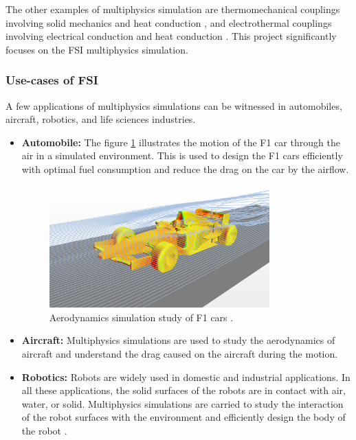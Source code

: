 The other examples of multiphysics simulation are thermomechanical couplings involving solid mechanics and heat conduction \cite{MpCCI_documentation}, and electrothermal couplings involving electrical conduction and heat conduction \cite{MpCCI_documentation}. This project significantly focuses on the FSI multiphysics simulation. 

\subsubsection{Use-cases of FSI}
\label{section:use-cases}
A few applications of multiphysics simulations can be witnessed in automobiles, aircraft, robotics, and life sciences industries.
\begin{itemize}

\item \textbf{Automobile:} The figure \ref{Fig:F1} illustrates the motion of the F1 car through the air in a simulated environment. This is used to design the F1 cars efficiently with optimal fuel consumption and reduce the drag on the car by the airflow.

\begin{figure}[!ht]
\centering
\includegraphics[width=0.8\textwidth]{images/f1_illustration.jpg}
\captionsetup{justification=justified}
\caption[Aerodynamics simulation study of F1 cars]{Aerodynamics simulation study of F1 cars \cite{MpCCI_documentation}.}
\label{Fig:F1}
\end{figure}

\item \textbf{Aircraft:} Multiphysics simulations are used to study the aerodynamics of aircraft and understand the drag caused on the aircraft during the motion.


\item \textbf{Robotics:} Robots are widely used in domestic and industrial applications. In all these applications, the solid surfaces of the robots are in contact with air, water, or solid. Multiphysics simulations are carried to study the interaction of the robot surfaces with the environment and efficiently design the body of the robot \cite{Robots_applications}.


\end{itemize}
